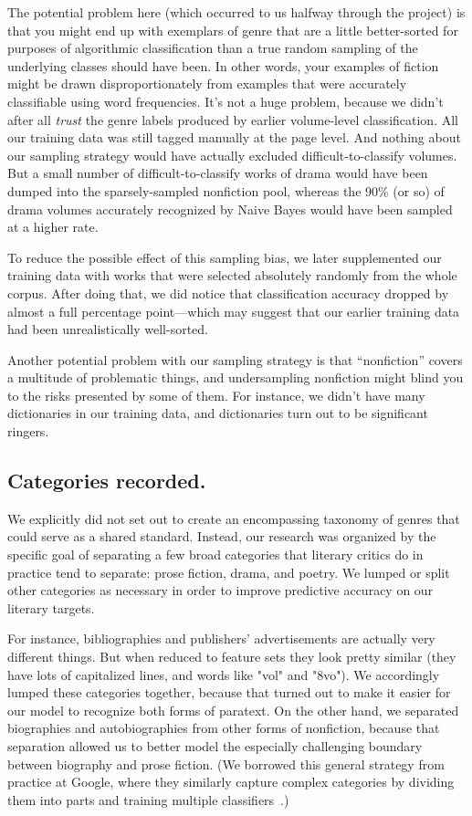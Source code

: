\documentclass[paper=a4, fontsize=12pt]{scrartcl}
\numberwithin{equation}{section}		%
\numberwithin{figure}{section}			%
\numberwithin{table}{section}				%
\begin{document}
The potential problem here (which occurred to us halfway through the project) is that you might end up with exemplars of genre that are a little better-sorted for purposes of algorithmic classification than a true random sampling of the underlying classes should have been. In other words, your examples of fiction might be drawn disproportionately from examples that were accurately classifiable using word frequencies. It's not a huge problem, because we didn't after all \textit{trust} the genre labels produced by earlier volume-level classification. All our training data was still tagged manually at the page level. And nothing about our sampling strategy would have actually excluded difficult-to-classify volumes. But a small number of difficult-to-classify works of drama would have been dumped into the sparsely-sampled nonfiction pool, whereas the 90\% (or so) of drama volumes accurately recognized by Naive Bayes would have been sampled at a higher rate.

To reduce the possible effect of this sampling bias, we later supplemented our training data with works that were selected absolutely randomly from the whole corpus. After doing that, we did notice that classification accuracy dropped by almost a full percentage point---which may suggest that our earlier training data had been unrealistically well-sorted.

Another potential problem with our sampling strategy is that ``nonfiction'' covers a multitude of problematic things, and undersampling nonfiction might blind you to the risks presented by some of them. For instance, we didn't have many dictionaries in our training data, and dictionaries turn out to be significant ringers.

\subsection{Categories recorded.}

We explicitly did not set out to create an encompassing taxonomy of genres that could serve as a shared standard. Instead, our research was organized by the specific goal of separating a few broad categories that literary critics do in practice tend to separate: prose fiction, drama, and poetry. We lumped or split other categories as necessary in order to improve predictive accuracy on our literary targets. 

For instance, bibliographies and publishers' advertisements are actually very different things. But when reduced to feature sets they look pretty similar (they have lots of capitalized lines, and words like "vol" and "8vo"). We accordingly lumped these categories together, because that turned out to make it easier for our model to recognize both forms of paratext. On the other hand, we separated biographies and autobiographies from other forms of nonfiction, because that separation allowed us to better model the especially challenging boundary between biography and prose fiction. (We borrowed this general strategy from practice at Google, where they similarly capture complex categories by dividing them into parts and training multiple classifiers~\cite{sculley:adversarial}.) 
\end{document}
